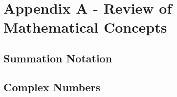 
	\section*{Appendix A - Review of Mathematical Concepts}

	\subsection*{Summation Notation}
	
	\subsection*{Complex Numbers}
